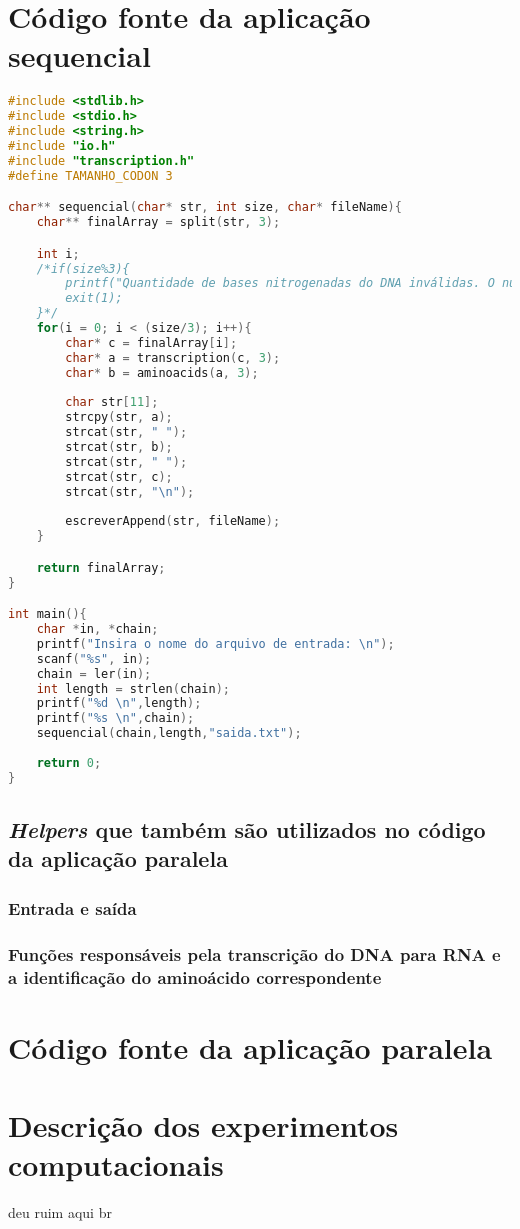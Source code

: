 \documentclass[a4paper,10pt]{article}
\begin{document}
\section{Código fonte da aplicação sequencial}
\begin{lstlisting}[language = C]
#include <stdlib.h>
#include <stdio.h>
#include <string.h>
#include "io.h"
#include "transcription.h"
#define TAMANHO_CODON 3

char** sequencial(char* str, int size, char* fileName){
    char** finalArray = split(str, 3);

    int i;
	/*if(size%3){
		printf("Quantidade de bases nitrogenadas do DNA inválidas. O número deve ser múltiplo de 3 \n");
		exit(1);
	}*/
    for(i = 0; i < (size/3); i++){
        char* c = finalArray[i];
        char* a = transcription(c, 3);
        char* b = aminoacids(a, 3);
        
        char str[11];
		strcpy(str, a);
		strcat(str, " ");
		strcat(str, b);
		strcat(str, " ");
		strcat(str, c);
		strcat(str, "\n");
        
        escreverAppend(str, fileName);
    }

    return finalArray;
}

int main(){
	char *in, *chain;
	printf("Insira o nome do arquivo de entrada: \n");
	scanf("%s", in);
	chain = ler(in);
	int length = strlen(chain);
	printf("%d \n",length);
	printf("%s \n",chain);
	sequencial(chain,length,"saida.txt");
	
	return 0;
}
\end{lstlisting}
\newpage
\subsection{\emph{Helpers} que também são utilizados no código da aplicação paralela}
\subsubsection{Entrada e saída}

\newpage

\subsubsection{Funções responsáveis pela transcrição do DNA para RNA e a identificação do aminoácido correspondente}

\newpage
\section{Código fonte da aplicação paralela}

\section{Descrição dos experimentos computacionais}
deu ruim aqui br



\end{document}
